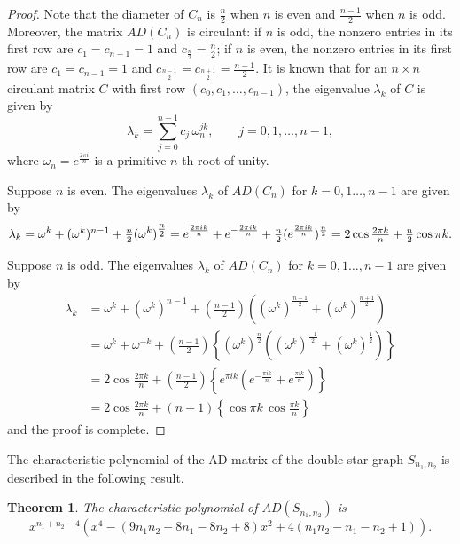 \documentclass[12pt]{article}
\numberwithin{equation}{section}
\newtheorem{thm}{Theorem}[section]
\begin{document}
	\begin{proof}
		Note that the diameter of $C_n$ is $\frac{n}{2}$ when $n$ is even and $\frac{n-1}{2}$ when $n$ is odd. Moreover, the matrix $AD(C_n)$ is circulant: if $n$ is odd, the nonzero entries in its first row are $c_1 = c_{n-1} = 1$ and $c_{\tfrac{n}{2}} = \tfrac{n}{2}$; if $n$ is even, the nonzero entries in its first row are $c_1 = c_{n-1} = 1$ and $c_{\tfrac{n-1}{2}} = c_{\tfrac{n+1}{2}} = \tfrac{n-1}{2}$. 
		It is known that for an $n \times n$ circulant matrix $C$ with first row $(c_0,c_1,\dots,c_{n-1})$, the eigenvalue $\lambda_k$ of $C$ is given by 
		\[\lambda_k=\overset{n-1}{\underset{j=0}{\sum}}c_j \, \omega^{jk}_n, \qquad  j=0,1,\dots,n-1,\] where $\omega_n = e^\frac{2 \pi i}{n}$ is a primitive $n$-th root of unity.
		
			Suppose $n$ is even. 	The eigenvalues $\lambda_k$ of $AD(C_n)$ for $k=0,1\dots,n-1$ are given by 
		\[	
		\lambda_k =	\omega^k +(\omega^k)^{n-1}+\tfrac{n}{2}(\omega^k)^{\tfrac{n}{2}}\\
			 = e^\frac{2 \pi i k}{n} +e^{-\frac{2 \pi i k}{n}}+\tfrac{n}{2} (e^\frac{2 \pi i k}{n})^{\frac{n}{2}}\\
			 =2 \cos \tfrac{2 \pi k}{n}+ \tfrac{n}{2} \cos \pi k.\]
	
		
		Suppose $n$ is odd.   The  eigenvalues $\lambda_k$ of $AD(C_n)$ for $k=0,1\dots,n-1$ are given by  
	  	\[
		\begin{aligned}
			\lambda_k&=\omega^k +(\omega^k)^{n-1}+\left(\tfrac{n-1}{2}\right)((\omega^k)^{\frac{n-1}{2}}+(\omega^k)^{\frac{n+1}{2}})\\
			& = \omega^k +\omega^{-k}+\left(\tfrac{n-1}{2}\right) \left\{(\omega^k)^{\tfrac{n}{2}} \left((\omega^k)^{\frac{-1}{2}}+(\omega^k)^{\frac{1}{2}}\right) \right\}\\
			& = 2 \cos \tfrac{2 \pi k}{n}+\left(\tfrac{n-1}{2}\right) \left\{e^{\pi i k} \left(e^{-\tfrac{\pi i k}{n}}+e^{\tfrac{\pi i k}{n}}\right)\right\}\\
			& = 2 \cos \tfrac{2 \pi k}{n}+ (n-1) \left\{\cos \pi k \,\cos \tfrac{\pi k}{n}\right\}
		\end{aligned}
		\]
	 and the proof is complete. 
	\end{proof}
	The characteristic polynomial of the AD matrix of the double star graph $S_{n_1,n_2}$ is described in the following result.
	\begin{thm}
	The characteristic polynomial of $AD(S_{n_1,n_2})$ is 
		\[x^{n_1+n_2-4}\left(x^4-\left(9n_1n_2-8n_1-8n_2+8\right)x^2+4\left(n_1n_2-n_1-n_2+1\right)\right).\]
	\end{thm}
\end{document}
